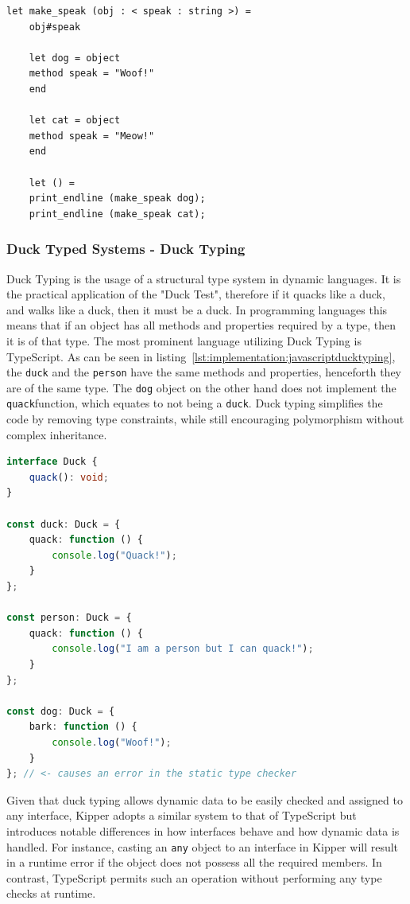 \begin{lstlisting}[language=caml,caption=Example of structural typing in Ocaml,label=lst:implementation:ocamlstructuraltyping]
	let make_speak (obj : < speak : string >) =
	obj#speak

	let dog = object
	method speak = "Woof!"
	end

	let cat = object
	method speak = "Meow!"
	end

	let () =
	print_endline (make_speak dog);
	print_endline (make_speak cat);
\end{lstlisting}

\subsubsection{Duck Typed Systems - Duck Typing}

Duck Typing is the usage of a structural type system in dynamic languages. It is the practical application of the "Duck Test", therefore if it quacks like a duck, and walks like a duck, then it must be a duck. In programming languages this means that if an object has all methods and properties required by a type, then it is of that type. The most prominent language utilizing Duck Typing is TypeScript. As can be seen in listing~\ref{lst:implementation:javascriptducktyping}, the \lstinline|duck| and the \lstinline|person| have the same methods and properties, henceforth they are of the same type. The \lstinline|dog| object on the other hand does not implement the \lstinline|quack|function, which equates to not being a \lstinline|duck|. Duck typing simplifies the code by removing type constraints, while still encouraging polymorphism without complex inheritance.

\begin{lstlisting}[language=Typescript,caption=Example of duck typing in TypeScript,label=lst:implementation:javascriptducktyping]
interface Duck {
	quack(): void;
}

const duck: Duck = {
	quack: function () {
		console.log("Quack!");
	}
};

const person: Duck = {
	quack: function () {
		console.log("I am a person but I can quack!");
	}
};

const dog: Duck = {
	bark: function () {
		console.log("Woof!");
	}
}; // <- causes an error in the static type checker
\end{lstlisting}

Given that duck typing allows dynamic data to be easily checked and assigned to any interface, Kipper adopts a similar system to that of TypeScript but introduces notable differences in how interfaces behave and how dynamic data is handled. For instance, casting an \lstinline|any| object to an interface in Kipper will result in a runtime error if the object does not possess all the required members. In contrast, TypeScript permits such an operation without performing any type checks at runtime.

